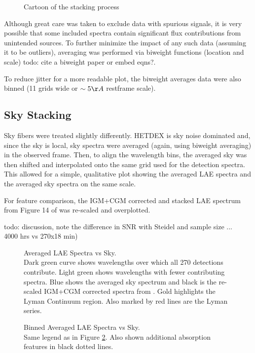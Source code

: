 \documentclass{aastex62}
\begin{document}
\begin{figure}[H]
\caption{Cartoon of the stacking process\label{fig:stacking cartoon}}
\end{figure}

Although great care was taken to exclude data with spurious signals, it is very possible that some included spectra contain significant flux contributions from unintended sources. To further minimize the impact of any such data (assuming it to be outliers), averaging was performed via biweight functions (location and scale) { \color{red} todo: cite a biweight paper or embed eqns?}.

To reduce jitter for a more readable plot, the biweight averages data were also binned (11 grids wide or $\sim 5 \AA$ restframe scale).

\subsection{Sky Stacking}

Sky fibers were treated slightly differently. HETDEX is sky noise dominated and, since the sky is local, sky spectra were averaged (again, using biweight averaging) in the observed frame. Then, to align the wavelength bins, the averaged sky was then shifted and interpolated onto the same grid used for the detection spectra. This allowed for a simple, qualitative plot showing the averaged LAE spectra and the averaged sky spectra on the same scale.

For feature comparison, the IGM+CGM corrected and stacked LAE spectrum from Figure 14 of \cite{Steidel} was re-scaled and overplotted.  

{ \color{red} todo: discussion, note the difference in SNR with Steidel and sample size ... ~ 4000 hrs vs 270x18 min)}


\begin{figure}[H]
\caption{Averaged LAE Spectra vs Sky. \label{fig:biweight_unbinned}\\
Dark green curve shows wavelengths over which all 270 detections contribute. Light green shows wavelengths with fewer contributing spectra. Blue shows the averaged sky spectrum and black is the re-scaled IGM+CGM corrected spectra from \cite{Steidel}. Gold highlights the Lyman Continuum region. Also marked by red lines are the Lyman series.}
\end{figure}

\begin{figure}[H]
\caption{Binned Averaged LAE Spectra vs Sky.\label{fig:biweight_binned} \\
Same legend as in Figure \ref{fig:biweight_unbinned}. Also shown additional absorption features in black dotted lines.}
\end{figure}
\end{document}
